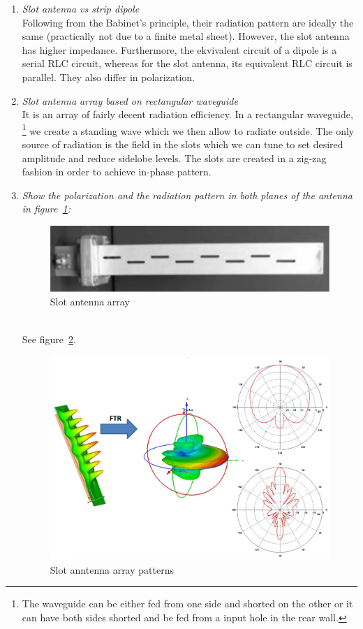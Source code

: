 \documentclass[11pt,a4paper]{article}
\begin{document}
\begin{enumerate}
    \item \emph{Slot antenna vs strip dipole}\\
    Following from the Babinet's principle, their radiation pattern are ideally the same (practically not due to a finite metal sheet). However, the slot antenna has higher impedance. Furthermore, the ekvivalent circuit of a dipole is a serial RLC circuit, whereas for the slot antenna, its equivalent RLC circuit is parallel. They also differ in polarization.
    
    \item \emph{Slot antenna array based on rectangular waveguide}\\
    It is an array of fairly decent radiation efficiency. In a rectangular waveguide,%
        \footnote{The waveguide can be either fed from one side and shorted on the other or it can have both sides shorted and be fed from a input hole in the rear wall.}
    we create a standing wave which we then allow to radiate outside. The only source of radiation is the field in the slots which we can tune to set desired amplitude and reduce sidelobe levels. The slots are created in a zig-zag fashion in order to achieve in-phase pattern.
    
    \item \emph{Show the polarization and the radiation pattern in both planes of the antenna in figure~\ref{fig:slot-antenna}:}
    \begin{figure}[!ht]
        \centering
        \includegraphics[width=.7\textwidth]{src/slot-antenna-array.png}
        \caption{\label{fig:slot-antenna}Slot antenna array}
    \end{figure}\\
    See figure~\ref{fig:slot-antenna-array}.
    \begin{figure}[!ht]
        \centering
        \includegraphics[width=.7\textwidth]{src/slot-antenna-array-patterns.png}
        \caption{\label{fig:slot-antenna-array}Slot anntenna array patterns}
    \end{figure}


\end{enumerate}
\end{document}
